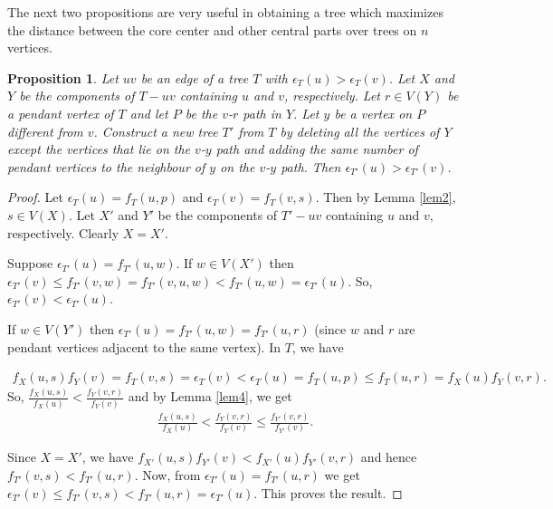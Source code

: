 \documentclass[11pt]{article}
\newtheorem{proposition}[theorem]{Proposition}
\begin{document}
The next two propositions are very useful in obtaining a tree which maximizes the distance between the core center and other central parts over trees on $n$ vertices.
\begin{proposition} \label{prop4}
Let $uv$ be an edge of a tree $T$ with $\epsilon_{T}(u)>\epsilon_{T}(v)$. Let $X$ and $Y$ be the components of $T-uv$ containing $u$ and $v$, respectively. Let $r\in V(Y)$ be a pendant vertex of $T$ and let $P$ be the $v$-$r$ path in $Y$. Let $y$ be a vertex on $P$ different from $v$. Construct a new tree $T'$ from $T$ by deleting all the vertices of $Y$ except the vertices that lie on the $v$-$y$ path and adding the same number of pendant vertices to the neighbour of $y$ on the $v$-$y$ path. Then $\epsilon_{T'}(u)>\epsilon_{T'}(v)$.   
\end{proposition}
\begin{proof}
Let $\epsilon_{T}(u)=f_T(u,p)$ and $\epsilon_{T}(v)=f_T(v,s)$. Then by Lemma \ref{lem2}, $s\in V(X).$ Let $X'$ and $Y'$ be the components of $T'-uv$ containing $u$ and $v$, respectively. Clearly $X=X'$.

Suppose $\epsilon_{T'}(u)=f_{T'}(u,w)$. If $w\in V(X')$ then ${\epsilon}_{T'}(v)\leq f_{T'}(v,w)=f_{T'}(v,u,w)<f_{T'}(u,w)={\epsilon}_{T'}(u)$.
So,  ${\epsilon}_{T'}(v)< {\epsilon}_{T'}(u)$.

If $w\in V(Y')$ then $\epsilon_{T'}(u)=f_{T'}(u,w)=f_{T'}(u,r)$ (since $w$ and $r$ are pendant vertices adjacent to the same vertex). In $T$, we have

\begin{align*}
 f_X(u,s)f_Y(v)=f_T(v,s)= \epsilon_T(v)<\epsilon_T(u)=f_T(u,p)\leq f_T(u,r)=f_X(u)f_Y(v,r).
\end{align*}
So, $\frac{f_X(u,s)}{f_X(u)}<\frac{f_Y(v,r)}{f_Y(v)}$ and by Lemma \ref{lem4}, we get
\begin{align*}
  \frac{f_X(u,s)}{f_X(u)}<\frac{f_Y(v,r)}{f_Y(v)}  \leq \frac{f_{Y'}(v,r)}{f_{Y'}(v)}.
\end{align*}
 
Since $X=X'$, we have $f_{X'}(u,s)f_{Y'}(v)< f_{X'}(u)f_{Y'}(v,r)$ and hence $f_{T'}(v,s)<f_{T'}(u,r)$. Now, from  $\epsilon_{T'}(u)=f_{T'}(u,r)$ we get $\epsilon_{T'}(v)\leq f_{T'}(v,s)<f_{T'}(u,r)=\epsilon_{T'}(u)$. This proves the result.
\end{proof}
\end{document}
